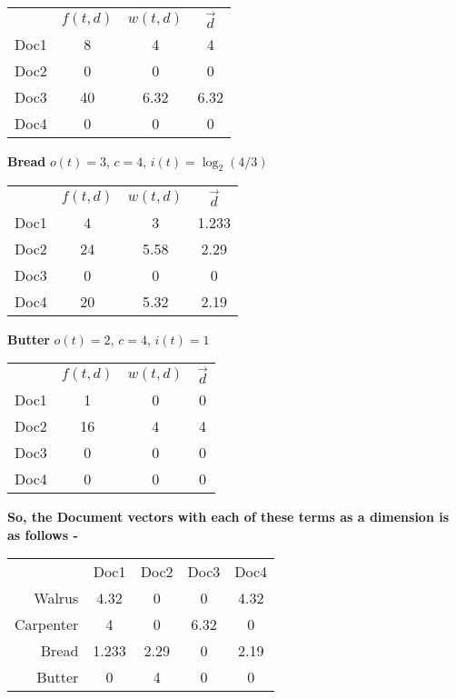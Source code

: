 \documentclass{article}
\begin{document}
\begin{tabular}{ r|c|c|c| }
\multicolumn{1}{r}{}
 & \multicolumn{1}{c}{$f(t,d)$}
 & \multicolumn{1}{c}{$w(t,d)$}
 & \multicolumn{1}{c}{$\vec{d}$} \\
\cline{2-4}
Doc1 & 8 & 4 & 4 \\
\cline{2-4}
Doc2 & 0 & 0 & 0 \\
\cline{2-4}
Doc3 & 40 & 6.32 & 6.32 \\
\cline{2-4}
Doc4 & 0 & 0 & 0 \\
\cline{2-4}
\end{tabular}

\vspace{5mm}
\textbf{Bread}
$o(t) = 3$, $c = 4$, $i(t) = \log_2(4/3)$

\begin{tabular}{ r|c|c|c| }
\multicolumn{1}{r}{}
 & \multicolumn{1}{c}{$f(t,d)$}
 & \multicolumn{1}{c}{$w(t,d)$}
 & \multicolumn{1}{c}{$\vec{d}$} \\
\cline{2-4}
Doc1 & 4 & 3 & 1.233 \\
\cline{2-4}
Doc2 & 24 & 5.58 & 2.29 \\
\cline{2-4}
Doc3 & 0 & 0 & 0 \\
\cline{2-4}
Doc4 & 20 & 5.32 & 2.19 \\
\cline{2-4}
\end{tabular}

\vspace{5mm}
\textbf{Butter}
$o(t) = 2$, $c = 4$, $i(t) = 1$


\begin{tabular}{ r|c|c|c| }
\multicolumn{1}{r}{}
 & \multicolumn{1}{c}{$f(t,d)$}
 & \multicolumn{1}{c}{$w(t,d)$}
 & \multicolumn{1}{c}{$\vec{d}$} \\
\cline{2-4}
Doc1 & 1 & 0 & 0 \\
\cline{2-4}
Doc2 & 16 & 4 & 4 \\
\cline{2-4}
Doc3 & 0 & 0 & 0 \\
\cline{2-4}
Doc4 & 0 & 0 & 0 \\
\cline{2-4}
\end{tabular}

\vspace{5mm}
\textbf{So, the Document vectors with each of these terms as a dimension is as follows - }

\begin{tabular}{ r|c|c|c|c| }
\multicolumn{1}{r}{}
 & \multicolumn{1}{c}{Doc1}
 & \multicolumn{1}{c}{Doc2}
 & \multicolumn{1}{c}{Doc3}
 & \multicolumn{1}{c}{Doc4} \\
\cline{2-5}
Walrus & 4.32 & 0 & 0 & 4.32 \\
\cline{2-5}
Carpenter & 4 & 0 & 6.32 & 0 \\
\cline{2-5}
Bread & 1.233 & 2.29 & 0 & 2.19 \\
\cline{2-5}
Butter & 0 & 4 & 0 & 0 \\
\cline{2-5}
\end{tabular}
\end{document}

